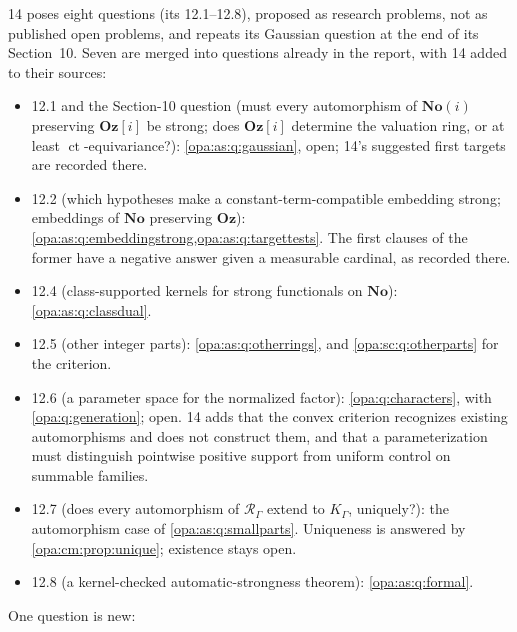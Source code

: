 \documentclass[11pt,oneside]{article}
\numberwithin{equation}{section}
\theoremstyle{definition}
\theoremstyle{remark}
\newcommand{\No}{\mathbf{No}}
\newcommand{\Oz}{\mathbf{Oz}}
\newcommand{\Og}{\mathbf{Oz}[i]}
\newcommand{\SC}{\mathbf{No}(i)}
\newcommand{\ct}{\operatorname{ct}}
\begin{document}
14 poses eight questions (its 12.1--12.8), proposed as research problems, not as published
open problems, and repeats its Gaussian question at the end of its Section~10. Seven are
merged into questions already in the report, with 14 added to their sources:
\begin{itemize}[itemsep=2pt]
\item 12.1 and the Section-10 question (must every automorphism of $\SC$ preserving $\Og$ be
strong; does $\Og$ determine the valuation ring, or at least $\ct$-equivariance?):
\cref{opa:as:q:gaussian}, open; 14's suggested first targets are recorded there.
\item 12.2 (which hypotheses make a constant-term-compatible embedding strong; embeddings of
$\No$ preserving $\Oz$): \cref{opa:as:q:embeddingstrong,opa:as:q:targettests}. The first
clauses of the former have a negative answer given a measurable cardinal, as recorded there.
\item 12.4 (class-supported kernels for strong functionals on $\No$): \cref{opa:as:q:classdual}.
\item 12.5 (other integer parts): \cref{opa:as:q:otherrings}, and \cref{opa:sc:q:otherparts}
for the criterion.
\item 12.6 (a parameter space for the normalized factor): \cref{opa:q:characters}, with
\cref{opa:q:generation}; open. 14 adds that the convex criterion recognizes existing
automorphisms and does not construct them, and that a parameterization must distinguish
pointwise positive support from uniform control on summable families.
\item 12.7 (does every automorphism of $\mathcal R_\Gamma$ extend to $K_\Gamma$, uniquely?): the
automorphism case of \cref{opa:as:q:smallparts}. Uniqueness is answered by
\cref{opa:cm:prop:unique}; existence stays open.
\item 12.8 (a kernel-checked automatic-strongness theorem): \cref{opa:as:q:formal}.
\end{itemize}
One question is new:
\end{document}
